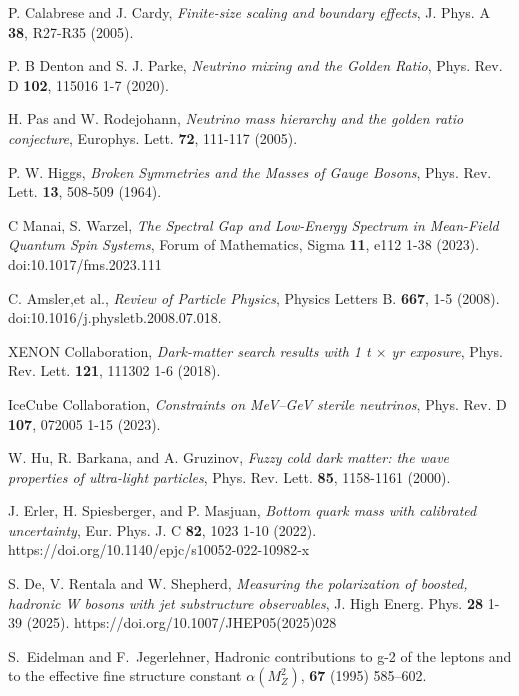\documentclass[%
 amsmath,amssymb,
 aps,
prb,
floatfix, showkeys
]{revtex4-2}
\begin{document}
\begin{thebibliography}{99}
  P. Calabrese  and  J. Cardy, {\it Finite-size scaling and boundary effects},
  J. Phys. A  {\bf 38}, R27-R35 (2005).

  P. B Denton  and  S. J. Parke, {\it Neutrino mixing and the Golden Ratio},
  Phys. Rev. D {\bf 102}, 115016 1-7 (2020).

  H. Pas and W. Rodejohann, {\it Neutrino mass hierarchy and the golden ratio conjecture},
  Europhys. Lett. {\bf 72}, 111-117 (2005).

 P. W. Higgs, {\it Broken Symmetries and the Masses of Gauge Bosons},
  Phys. Rev. Lett. {\bf 13}, 508-509 (1964).
  
   C Manai, S. Warzel,
   {\it  The Spectral Gap and Low-Energy Spectrum in Mean-Field Quantum Spin Systems}, 
     Forum of Mathematics, Sigma {\bf 11}, e112 1-38 (2023). doi:10.1017/fms.2023.111 

  C. Amsler,et al., {\it Review of Particle Physics},
  Physics Letters B.  {\bf 667}, 1-5 (2008). doi:10.1016/j.physletb.2008.07.018.

  XENON Collaboration,  {\it Dark-matter search results with 1 t $\times$ yr exposure},
  Phys. Rev. Lett. {\bf 121}, 111302 1-6  (2018).
  
  IceCube Collaboration, {\it Constraints on MeV–GeV sterile neutrinos},
  Phys. Rev. D  {\bf 107}, 072005 1-15 (2023).

  W. Hu, R. Barkana,  and A. Gruzinov,
  {\it Fuzzy cold dark matter: the wave properties of ultra-light particles},
  Phys. Rev. Lett. {\bf 85}, 1158-1161  (2000).

  J. Erler, H. Spiesberger, and P.  Masjuan,
  {\it Bottom quark mass with calibrated uncertainty},
  Eur. Phys. J. C  {\bf 82}, 1023 1-10 (2022). https://doi.org/10.1140/epjc/s10052-022-10982-x

  S. De, V. Rentala and W. Shepherd,
  {\it Measuring the polarization of boosted, hadronic W bosons with jet substructure observables},
   J. High Energ. Phys. {\bf  28} 1-39 (2025). https://doi.org/10.1007/JHEP05(2025)028
  


S.~Eidelman and F.~Jegerlehner,
\newblock Hadronic contributions to g-2 of the leptons and to the effective fine structure constant $\alpha(M_Z^2)$,
 {\bf 67} (1995) 585--602.


\end{thebibliography}
\end{document}
